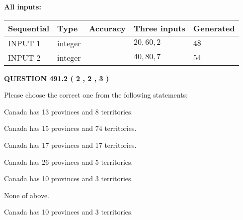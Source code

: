 \documentclass[12pt]{article}
\begin{document}
   
   
   
\noindent{}
   
   
   
   
\noindent\vspace{0.1in}\hspace{-0.08in} {\textbf{\Large{All inputs: }}}
   
   
  
  
\noindent\begin{tabular}{|l|l|l|l|l|}
\hline
 Sequential & Type & Accuracy & Three inputs & Generated \\ 
\hline
 
 
  INPUT $  1 $ & integer &  & $
 20
 , 
 60
 , 
 2
 $ & $ 48 $ 
 \\  \hline  
 
 
  INPUT $  2 $ & integer &  & $
 40
 , 
 80
 , 
 7
 $ & $ 54 $ 
 \\  \hline  
 \end{tabular}
   
   
  
\vspace{0.2in}
  
{\textbf{\Large{QUESTION
491.2 
 ( 2 , 2 , 3 )
}}}
  
  
Please choose the correct one from the following statements:
 
 
Canada has  13 provinces and  8 territories.
 
 
Canada has  15 provinces and  74 territories.
 
 
Canada has  17 provinces and  17 territories.
 
 
Canada has  26 provinces and  5 territories.
 
 
Canada has 10  provinces and 3 territories.
 
 
 None of above.
 
 
\noindent{}
 
 
Canada has 10  provinces and 3 territories.
 
 
\noindent{}
 
 
   
\end{document}
